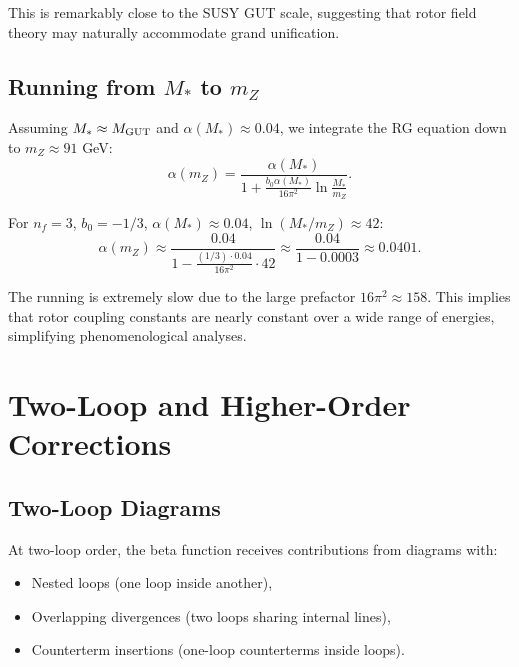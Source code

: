 \documentclass[11pt,a4paper]{article}
\numberwithin{equation}{section}
\theoremstyle{plain}
\theoremstyle{definition}
\theoremstyle{remark}
\begin{document}
This is remarkably close to the SUSY GUT scale, suggesting that rotor field theory may naturally accommodate grand unification.

\subsection{Running from $M_*$ to $m_Z$}

Assuming $M_* \approx M_{\rm GUT}$ and $\alpha(M_*)\approx 0.04$, we integrate the RG equation down to $m_Z\approx 91$ GeV:
\begin{equation}
\alpha(m_Z) = \frac{\alpha(M_*)}{1 + \frac{b_0\alpha(M_*)}{16\pi^2}\ln\frac{M_*}{m_Z}}.
\label{eq:alpha-mZ}
\end{equation}

For $n_f=3$, $b_0=-1/3$, $\alpha(M_*)\approx 0.04$, $\ln(M_*/m_Z)\approx 42$:
\begin{equation}
\alpha(m_Z) \approx \frac{0.04}{1 - \frac{(1/3)\cdot 0.04}{16\pi^2}\cdot 42} \approx \frac{0.04}{1 - 0.0003} \approx 0.0401.
\label{eq:alpha-mZ-value}
\end{equation}

The running is extremely slow due to the large prefactor $16\pi^2\approx 158$. This implies that rotor coupling constants are nearly constant over a wide range of energies, simplifying phenomenological analyses.

\vspace{1em}

\section{Two-Loop and Higher-Order Corrections}\label{sec:twoloop}

\subsection{Two-Loop Diagrams}

At two-loop order, the beta function receives contributions from diagrams with:
\begin{itemize}
  \item Nested loops (one loop inside another),
  \item Overlapping divergences (two loops sharing internal lines),
  \item Counterterm insertions (one-loop counterterms inside loops).
\end{itemize}
\end{document}
